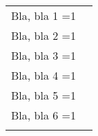 \documentclass{article}
\makeatletter
\newenvironment{blocks}
		{\begin{longtable}{|c|c|}\hline}
		{\end{longtable}}
\def\temp@one@block{0}
\def\changerow{&}
\newenvironment{oneBlock}
		{\xdef\temp@one@block{\ifnum\temp@one@block=1 0\else 1\fi}}
		{\ifnum\temp@one@block=1
			\aftergroup\changerow
		\else
			\aftergroup\\\aftergroup\hline
		\fi}
\makeatother
\begin{document}
\begin{blocks}
	\begin{oneBlock}
		Bla, bla 1
	\end{oneBlock}

	\begin{oneBlock}
		Bla, bla 2
	\end{oneBlock}

	\begin{oneBlock}
		Bla, bla 3
	\end{oneBlock}

	\begin{oneBlock}
		Bla, bla 4
	\end{oneBlock}

	\begin{oneBlock}
		Bla, bla 5
	\end{oneBlock}

	\begin{oneBlock}
		Bla, bla 6
	\end{oneBlock}
\end{blocks}
\end{document}
